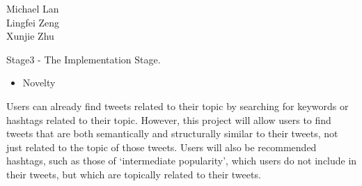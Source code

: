 \documentclass[10pt]{article}
\begin{document}
	\begin{raggedright}	
		Michael Lan \\
		Lingfei Zeng \\
		Xunjie Zhu \\
	\end{raggedright}


	
Stage3 - The Implementation Stage. \\

\begin{itemize}
	\item Novelty
\end{itemize}
Users can already find tweets related to their topic by searching for keywords or hashtags related to their topic. However, this project will allow users to find tweets that are both semantically and structurally similar to their tweets, not just related to the topic of those tweets. Users will also be recommended hashtags, such as those of ‘intermediate popularity’, which users do not include in their tweets, but which are topically related to their tweets.
\end{document}
